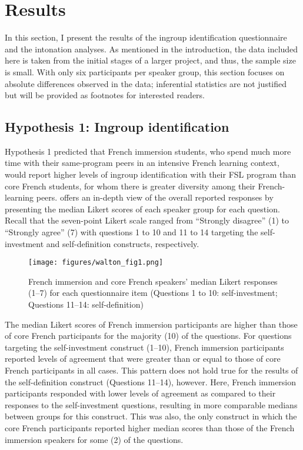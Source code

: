 \documentclass[output=paper,colorlinks,citecolor=brown,draftmode]{langscibook}
\begin{document}
\section{Results}\label{sec:11:4}
In this section, I present the results of the ingroup identification questionnaire and the intonation analyses. As mentioned in the introduction, the data included here is taken from the initial stages of a larger project, and thus, the sample size is small. With only six participants per speaker group, this section focuses on absolute differences observed in the data; inferential statistics are not justified but will be provided as footnotes for interested readers.

\subsection{Hypothesis 1: Ingroup identification}
Hypothesis 1 predicted that French immersion students, who spend much more time with their same-program peers in an intensive French learning context, would report higher levels of ingroup identification with their FSL program than core French students, for whom there is greater diversity among their French-learning peers.  offers an in-depth view of the overall reported responses by presenting the median Likert scores of each speaker group for each question. Recall that the seven-point Likert scale ranged from “Strongly disagree” (1) to “Strongly agree” (7) with questions 1 to 10 and 11 to 14 targeting the self-investment and self-definition constructs, respectively.

\begin{figure}
    \texttt{[image: figures/walton\_fig1.png]}
    \caption{French immersion and core French speakers’ median Likert responses (1--7) for each questionnaire item (Questions 1 to 10: self-investment; Questions 11--14: self-definition)}
    \label{Questionnaire.All}
\end{figure}

The median Likert scores of French immersion participants are higher than those of core French participants for the majority (10) of the questions. For questions targeting the self-investment construct (1--10), French immersion participants reported levels of agreement that were greater than or equal to those of core French participants in all cases. This pattern does not hold true for the results of the self-definition construct (Questions 11--14), however. Here, French immersion participants responded with lower levels of agreement as compared to their responses to the self-investment questions, resulting in more comparable medians between groups for this construct. This was also, the only construct in which the core French participants reported higher median scores than those of the French immersion speakers for some (2) of the questions.
\end{document}
